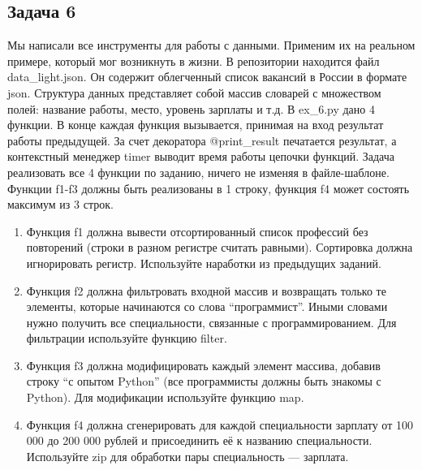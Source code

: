 \documentclass{article}
\begin{document}
\subsection{Задача 6}
Мы написали все инструменты для работы с данными. Применим их на реальном примере, который мог возникнуть в жизни. В репозитории находится файл data\_light.json. Он содержит облегченный список вакансий в России в формате json.
Структура данных представляет собой массив словарей с множеством полей: название работы, место, уровень зарплаты и т.д.
В ex\_6.py дано 4 функции. В конце каждая функция вызывается, принимая на вход результат работы предыдущей. За счет декоратора @print\_result печатается результат, а контекстный менеджер timer выводит время работы цепочки функций.
Задача реализовать все 4 функции по заданию, ничего не изменяя в файле-шаблоне. Функции f1-f3 должны быть реализованы в 1 строку, функция f4 может состоять максимум из 3 строк.

\begin{enumerate}
    \item Функция f1 должна вывести отсортированный список профессий без повторений (строки в разном регистре считать равными). Сортировка должна игнорировать регистр. Используйте наработки из предыдущих заданий.
    \item Функция f2 должна фильтровать входной массив и возвращать только те элементы, которые начинаются со слова “программист”. Иными словами нужно получить все специальности, связанные с программированием. Для фильтрации используйте функцию filter.
    \item Функция f3 должна модифицировать каждый элемент массива, добавив строку “с опытом Python” (все программисты должны быть знакомы с Python). Для модификации используйте функцию map.
    \item Функция f4 должна сгенерировать для каждой специальности зарплату от 100 000 до 200 000 рублей и присоединить её к названию специальности. Используйте zip для обработки пары специальность — зарплата.
\end{enumerate}
\end{document}
